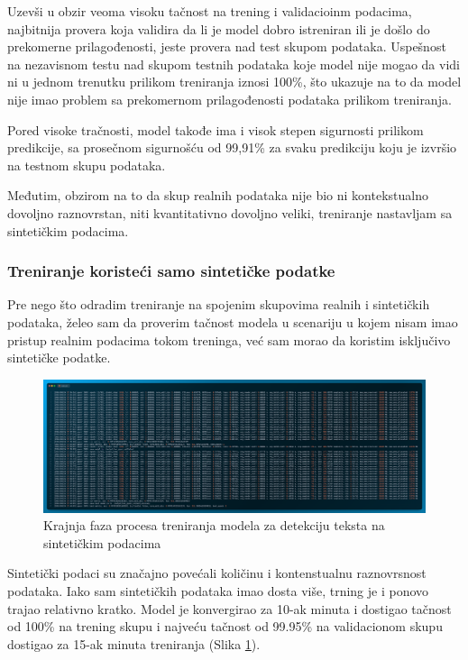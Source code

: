 \documentclass[a4paper,12pt]{article}
\begin{document}
	Uzevši u obzir veoma visoku tačnost na trening i validacioinm podacima, najbitnija provera koja validira da li je model dobro istreniran ili je došlo do prekomerne prilagođenosti, jeste provera nad test skupom podataka. Uspešnost na nezavisnom testu nad skupom testnih podataka koje model nije mogao da vidi ni u jednom trenutku prilikom treniranja iznosi 100\%, što ukazuje na to da model nije imao problem sa prekomernom prilagođenosti podataka prilikom treniranja.
	
	Pored visoke tračnosti, model takođe ima i visok stepen sigurnosti prilikom predikcije, sa prosečnom sigurnošću od 99,91\% za svaku predikciju koju je izvršio na testnom skupu podataka.
	
	Međutim, obzirom na to da skup realnih podataka nije bio ni kontekstualno dovoljno raznovrstan, niti kvantitativno dovoljno veliki, treniranje nastavljam sa sintetičkim podacima.
	
	\subsubsection{Treniranje koristeći samo sintetičke podatke}
	Pre nego što odradim treniranje na spojenim skupovima realnih i sintetičkih podataka, želeo sam da proverim tačnost modela u scenariju u kojem nisam imao pristup realnim podacima tokom treninga, već sam morao da koristim isključivo sintetičke podatke.
	
	\begin{figure}[H]
		\centering
		\includegraphics[width=\textwidth]{assets/train-code-synthetic-data.png}
		\caption{Krajnja faza procesa treniranja modela za detekciju teksta na sintetičkim podacima}
		\label{fig:train-code-synthetic-data}
	\end{figure}
	
	Sintetički podaci su značajno povećali količinu i kontenstualnu raznovrsnost podataka. Iako sam sintetičkih podataka imao dosta više, trning je i ponovo trajao relativno kratko. Model je konvergirao za 10-ak minuta i dostigao tačnost od 100\% na trening skupu i najveću tačnost od 99.95\% na validacionom skupu dostigao za 15-ak minuta treniranja (Slika \ref{fig:train-code-synthetic-data}).\newline
	
\end{document}
